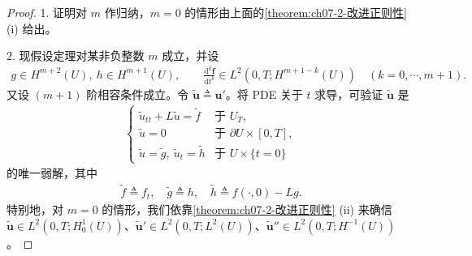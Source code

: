 \documentclass[../../main.tex]{subfiles}
\begin{document}
\begin{proof}
1. 证明对 $m$ 作归纳，$m=0$ 的情形由上面的\cref{theorem:ch07-2-改进正则性} (i) 给出。

2. 现假设定理对某非负整数 $m$ 成立，并设
\begin{align}
g\in H^{m+2}(U),\ h\in H^{m+1}(U),\qquad \frac{\mathrm{d}^k\mathbf{f}}{\mathrm{d}t^k}\in L^2(0,T;H^{m+1-k}(U))\quad (k=0,\cdots,m+1).\label{align:ch07-2-eq67}
\end{align}
又设 $(m+1)$ 阶相容条件成立。令 $\widetilde{\mathbf{u}}\triangleq\mathbf{u}'$。将 PDE 关于 $t$ 求导，可验证 $\widetilde{\mathbf{u}}$ 是
\begin{align}
\begin{cases}
\widetilde{u}_{tt}+L\widetilde{u}=\widetilde{f} & \text{于 } U_T,\\
\widetilde{u}=0 & \text{于 } \partial U\times[0,T],\\
\widetilde{u}=\widetilde{g},\ \widetilde{u}_t=\widetilde{h} & \text{于 } U\times\{t=0\}
\end{cases}\label{align:ch07-2-eq68}
\end{align}
的唯一弱解，其中
\begin{align}
\widetilde{f}\triangleq f_t,\quad \widetilde{g}\triangleq h,\quad \widetilde{h}\triangleq f(\cdot,0)-Lg.\label{align:ch07-2-eq69}
\end{align}
特别地，对 $m=0$ 的情形，我们依靠\cref{theorem:ch07-2-改进正则性} (ii) 来确信 $\widetilde{\mathbf{u}}\in L^2(0,T;H^1_0(U))$、$\widetilde{\mathbf{u}}'\in L^2(0,T;L^2(U))$、$\widetilde{\mathbf{u}}''\in L^2(0,T;H^{-1}(U))$。


\end{proof}
\end{document}
